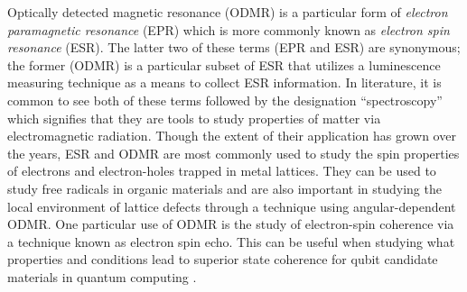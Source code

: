 \documentclass[oneside]{BYUPhys}
\begin{document}
Optically detected magnetic resonance (ODMR) is a particular form of \textit{electron paramagnetic resonance} (EPR) which is more commonly known as \textit{electron spin resonance} (ESR). The latter two of these terms (EPR and ESR) are synonymous; the former (ODMR) is a particular subset of ESR that utilizes a luminescence measuring technique as a means to collect ESR information. In literature, it is common to see both of these terms followed by the designation ``spectroscopy'' which signifies that they are tools to study properties of matter via electromagnetic radiation. Though the extent of their application has grown over the years, ESR and ODMR are most commonly used to study the spin properties of electrons and electron-holes trapped in metal lattices. They can be used to study free radicals in organic materials \cite{RefWorks:doc:589299ede4b0dec22aee3bd4} and are also important in studying the local environment of lattice defects through a technique using angular-dependent ODMR. One particular use of ODMR is the study of electron-spin coherence via a technique known as electron spin echo. This can be useful when studying what properties and conditions lead to superior state coherence for qubit candidate materials in quantum computing \cite{RefWorks:doc:58929786e4b0228a292929b8}.
\end{document}

